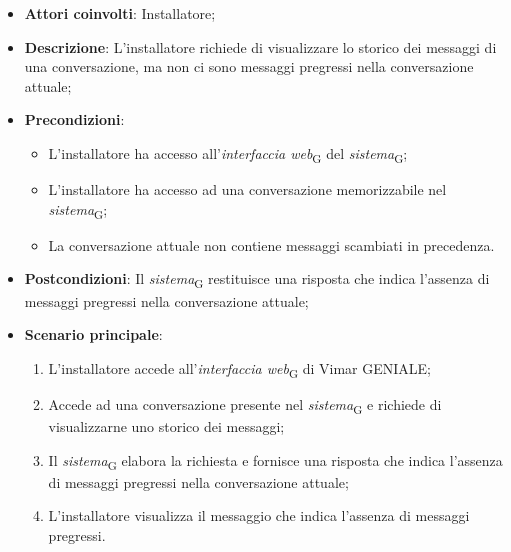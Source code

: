 \begin{itemize}
    \item \textbf{Attori coinvolti}: Installatore;
    \item \textbf{Descrizione}: L’installatore richiede di visualizzare lo storico dei messaggi di una conversazione, ma non ci sono messaggi pregressi nella conversazione attuale;
    \item \textbf{Precondizioni}: 
        \begin{itemize}
            \item L’installatore ha accesso all’\textit{interfaccia web}\textsubscript{G} del \textit{sistema}\textsubscript{G};
            \item L’installatore ha accesso ad una conversazione memorizzabile nel \textit{sistema}\textsubscript{G};
            \item La conversazione attuale non contiene messaggi scambiati in precedenza.
        \end{itemize}
    \item \textbf{Postcondizioni}: Il \textit{sistema}\textsubscript{G} restituisce una risposta che indica l’assenza di messaggi pregressi nella conversazione attuale;
    \item \textbf{Scenario principale}:
    \begin{enumerate}
    \item L’installatore accede all’\textit{interfaccia web}\textsubscript{G} di Vimar GENIALE;
    \item Accede ad una conversazione presente nel \textit{sistema}\textsubscript{G} e richiede di visualizzarne uno storico dei messaggi;
    \item Il \textit{sistema}\textsubscript{G} elabora la richiesta e fornisce una risposta che indica l’assenza di messaggi pregressi nella conversazione attuale;
    \item L’installatore visualizza il messaggio che indica l’assenza di messaggi pregressi.
    \end{enumerate}
\end{itemize}



